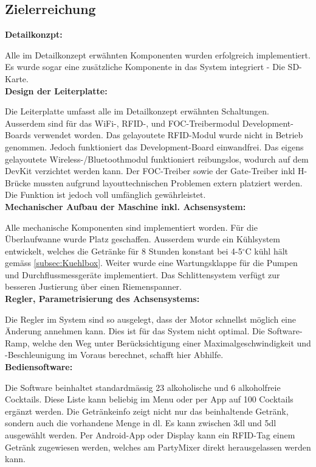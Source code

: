 \subsection{Zielerreichung}
\label{subsec:Zielerreichung}


\textbf{Detailkonzpt:}

Alle im Detailkonzept erwähnten Komponenten wurden erfolgreich implementiert. Es wurde sogar eine zusätzliche Komponente in das System integriert - Die SD-Karte.\\

\textbf{Design der Leiterplatte:} 

Die Leiterplatte umfasst alle im Detailkonzept erwähnten Schaltungen. Ausserdem sind für das WiFi-, RFID-, und FOC-Treibermodul Development-Boards verwendet worden. Das gelayoutete RFID-Modul wurde nicht in Betrieb genommen. Jedoch funktioniert das Development-Board einwandfrei. Das eigens gelayoutete Wireless-/Bluetoothmodul funktioniert reibungslos, wodurch auf dem DevKit verzichtet werden kann. Der FOC-Treiber sowie der Gate-Treiber inkl H-Brücke mussten aufgrund layouttechnischen Problemen extern platziert werden. Die Funktion ist jedoch voll umfänglich gewährleistet.\\

\textbf{Mechanischer Aufbau der Maschine inkl. Achsensystem:}

Alle mechanische Komponenten sind implementiert worden. Für die Überlaufwanne wurde Platz geschaffen. Ausserdem wurde ein Kühlsystem entwickelt, welches die Getränke für 8 Stunden konstant bei 4-5$^\circ$C kühl hält gemäss \ref{subsec:Kuehlbox}. Weiter wurde eine Wartungsklappe für die Pumpen und Durchflussmessgeräte implementiert. Das Schlittensystem verfügt zur besseren Justierung über einen Riemenspanner.\\

\textbf{Regler, Parametrisierung des Achsensystems:}

Die Regler im System sind so ausgelegt, dass der Motor schnellst möglich eine Änderung annehmen kann. Dies ist für das System nicht optimal. Die Software-Ramp, welche den Weg unter Berücksichtigung einer Maximalgeschwindigkeit und -Beschleunigung im Voraus berechnet, schafft hier Abhilfe.\\

\textbf{Bediensoftware:}

Die Software beinhaltet standardmässig 23 alkoholische und 6 alkoholfreie Cocktails. Diese Liste kann beliebig im Menu oder per App auf 100 Cocktails ergänzt werden. Die Getränkeinfo zeigt nicht nur das beinhaltende Getränk, sondern auch die vorhandene Menge in dl. Es kann zwischen 3dl und 5dl ausgewählt werden. Per Android-App oder Display kann ein RFID-Tag einem Getränk zugewiesen werden, welches am PartyMixer direkt herausgelassen werden kann.\\

